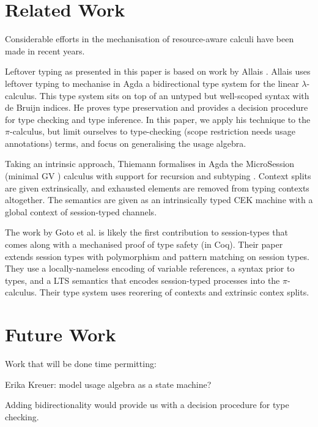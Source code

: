 \documentclass[a4paper,UKenglish,cleveref,autoref,thm-restate,authorcolumns]{lipics-v2019}
\theoremstyle{definition}
\newcommand{\lambdacalc}{$\lambda$-calculus}
\newcommand{\picalc}{$\pi$-calculus}
\begin{document}
\section{Related Work}

Considerable efforts in the mechanisation of resource-aware calculi have been made in recent years.

Leftover typing as presented in this paper is based on work by Allais \cite{Allais2018a}.
Allais uses leftover typing to mechanise in Agda a bidirectional type system for the linear \lambdacalc{}.
This type system sits on top of an untyped but well-scoped syntax with de Bruijn indices.
He proves type preservation and provides a decision procedure for type checking and type inference.
In this paper, we apply his technique to the \picalc{}, but limit ourselves to type-checking (scope restriction needs usage annotations) terms, and focus on generalising the usage algebra.

Taking an intrinsic approach, Thiemann formalises in Agda the MicroSession (minimal GV \cite{}) calculus with support for recursion and subtyping \cite{Thiemann2019}.
Context splits are given extrinsically, and exhausted elements are removed from typing contexts altogether.
The semantics are given as an intrinsically typed CEK machine with a global context of session-typed channels.

The work by Goto et al. \cite{Goto2016a} is likely the first contribution to session-types that comes along with a mechanised proof of type safety (in Coq). 
Their paper extends session types with polymorphism and pattern matching on session types.
They use a locally-nameless encoding of variable references, a syntax prior to types, and a LTS semantics that encodes session-typed processes into the \picalc{}.
Their type system uses reorering of contexts and extrinsic contex splits. 

\cite{Rouvoet2020}
\cite{Veltri2020}
\cite{Gay2001}

\section{Future Work}

Work that will be done time permitting:

Erika Kreuer: model usage algebra as a state machine?

Adding bidirectionality would provide us with a decision procedure for type checking.
\end{document}
